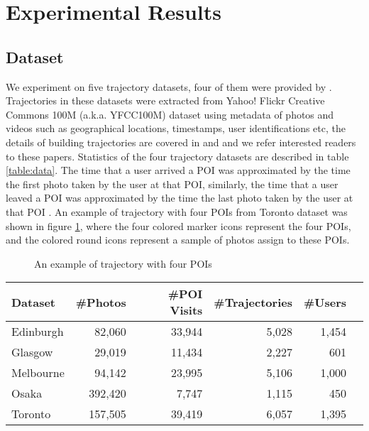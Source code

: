 \section{Experimental Results}
\label{experiment}

\subsection{Dataset}
\label{experiment:dataset}
We experiment on five trajectory datasets, four of them were provided by \cite{ijcai15}.
Trajectories in these datasets were extracted from Yahoo! Flickr Creative Commons 100M
(a.k.a. YFCC100M) dataset\cite{thomee2016yfcc100m} using metadata of photos and videos
such as geographical locations, timestamps, user identifications etc,
the details of building trajectories are covered in \cite{ht10} and \cite{ijcai15} and
we refer interested readers to these papers.
Statistics of the four trajectory datasets are described in table \ref{table:data}.
%
The time that a user arrived a POI was approximated by the time the first photo taken by the user at that POI,
similarly, the time that a user leaved a POI was approximated by the time the last photo taken by the user at
that POI \cite{ht10, ijcai15}.
An example of trajectory with four POIs from Toronto dataset was shown in figure \ref{fig:traj},
where the four colored marker icons represent the four POIs,
and the colored round icons represent a sample of photos assign to these POIs.


\begin{figure}
\centering
{}
\caption{An example of trajectory with four POIs}
\label{fig:traj}
\end{figure}

\begin{table*}
\centering
\begin{tabular}{lrrrrr} \hline
\textbf{Dataset} & \textbf{\#Photos} & \textbf{\#POI Visits} & \textbf{\#Trajectories} & \textbf{\#Users} \\ \hline
Edinburgh & 82,060 & 33,944 & 5,028 & 1,454 \\
Glasgow & 29,019 & 11,434 & 2,227 & 601 \\
Melbourne & 94,142 & 23,995 & 5,106 & 1,000 \\
Osaka & 392,420 & 7,747 & 1,115 & 450 \\
Toronto & 157,505 & 39,419 & 6,057 & 1,395 \\
\hline
\end{tabular}
\caption{Statistics of trajectory dataset}
\label{table:data}
\end{table*}


